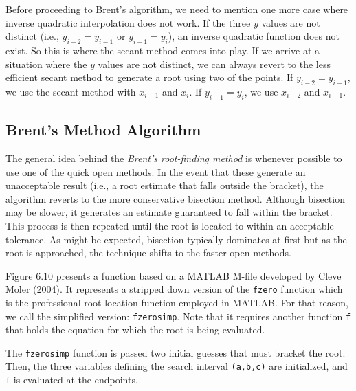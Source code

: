 \documentclass[../main.tex]{subfiles}
\begin{document}
Before proceeding to Brent's algorithm, we need to mention one more case where
inverse quadratic interpolation does not work. If the three $y$ values are not distinct (i.e.,
$y_{i-2} = y_{i-1}$ or $y_{i-1} = y_i$), an inverse quadratic function does not exist. So this is where the
secant method comes into play. If we arrive at a situation where the $y$ values are not distinct,
we can always revert to the less efficient secant method to generate a root using two of
the points. If $y_{i-2} = y_{i-1}$, we use the secant method with $x_{i-1}$ and $x_i$. If $y_{i-1} = y_i$, we use $x_{i-2}$
and $x_{i-1}$.\\

\subsection{Brent's Method Algorithm}
\noindent The general idea behind the \emph{Brent's root-finding method} is whenever possible to use one of
the quick open methods. In the event that these generate an unacceptable result (i.e., a root
estimate that falls outside the bracket), the algorithm reverts to the more conservative
bisection method. Although bisection may be slower, it generates an estimate guaranteed to
fall within the bracket. This process is then repeated until the root is located to within an
acceptable tolerance. As might be expected, bisection typically dominates at first but as the
root is approached, the technique shifts to the faster open methods.

Figure 6.10 presents a function based on a MATLAB M-file developed by Cleve
Moler (2004). It represents a stripped down version of the \texttt{fzero} function which is the professional
root-location function employed in MATLAB. For that reason, we call the
simplified version: \texttt{fzerosimp}. Note that it requires another function \texttt{f} that holds the
equation for which the root is being evaluated.

The \texttt{fzerosimp} function is passed two initial guesses that must bracket the root.
Then, the three variables defining the search interval \texttt{(a,b,c)} are initialized, and \texttt{f} is evaluated
at the endpoints.\\
\end{document}
